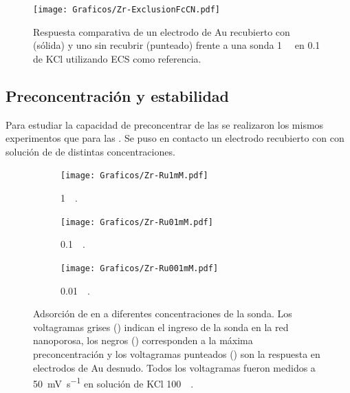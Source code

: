 				\begin{figure}[ht]
				\centering
		 	    \texttt{[image: Graficos/Zr-ExclusionFcCN.pdf]}
		        \caption[Exclusión electrostática en \pdmZ]{Respuesta comparativa de un electrodo de Au recubierto con \pdmZ\space (sólida) y uno sin recubrir (punteado) frente a una sonda \ferroferri\space \SI{1}{\milli\Molar} en \SI{0.1}{\Molar} de KCl utilizando ECS como referencia.}
		        \label{fig:fcn-zr}
		      	\end{figure} 
	 
	 \subsection{Preconcentración y estabilidad}\label{sub:pcirc}

		 	Para estudiar la capacidad de preconcentrar de las \pdmZ\space se realizaron los mismos experimentos que para las \pdmF. Se puso en contacto un electrodo recubierto con \pdmZ\space con solución de \ru\space de distintas concentraciones. 


	 			\begin{figure}[th]
			   	    \begin{subfigure}[t]{0.325\textwidth}
			        	\texttt{[image: Graficos/Zr-Ru1mM.pdf]}
			        	\vspace*{-0.40cm}\caption{\aminorutenio\space \SI{1}{\milli\Molar}.}
			         	\label{fig:Zr-Ru1mM}
			     		\end{subfigure}
			   	    \begin{subfigure}[t]{0.325\textwidth}
			        	\texttt{[image: Graficos/Zr-Ru01mM.pdf]}
			       		\vspace*{-0.40cm}\caption{\aminorutenio\space \SI{0.1}{\milli\Molar}.}
			         	\label{fig:Zr-Ru0.1mM}
			     		\end{subfigure}
		     		\begin{subfigure}[t]{0.325\textwidth}
			        	\texttt{[image: Graficos/Zr-Ru001mM.pdf]}
			       		\vspace*{-0.40cm}\caption{\aminorutenio\space \SI{0.01}{\milli\Molar}.}
			         	\label{fig:Zr-Ru0.01mM}
			     		\end{subfigure}
			     		\caption[Preconcentración de \aminorutenio\space en \pdmZ]{Adsorción de \ru\space en \pdmZ\space a diferentes concentraciones de la sonda. Los voltagramas grises (\usebox{\gris}) indican el ingreso de la sonda en la red nanoporosa, los negros (\usebox{\negro}) corresponden a la máxima preconcentración y los voltagramas punteados (\usebox{\punteado}) son la respuesta en electrodos de Au desnudo. Todos los voltagramas fueron medidos a \SI{50}{\milli\volt\per\second} en solución de KCl \SI{100}{\milli\Molar}.}
			     		\label{fig:precon_ZR}
		     		\end{figure}
		
